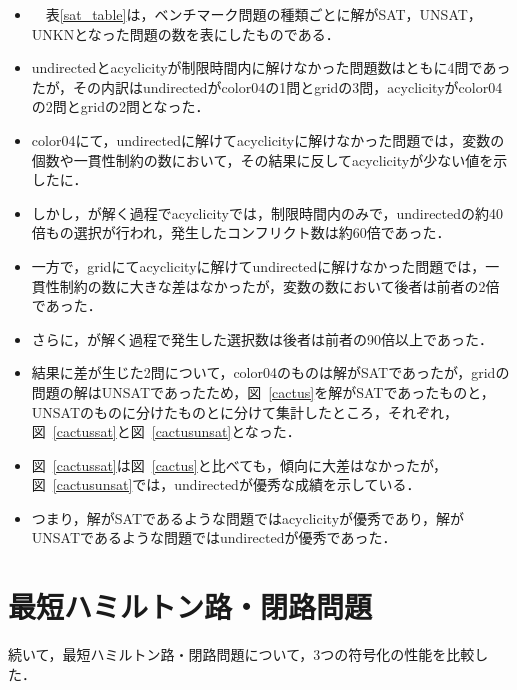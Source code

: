 \begin{itemize}
\item　表\ref{sat_table}は，ベンチマーク問題の種類ごとに解がSAT，UNSAT，UNKNとなった問題の数を表にしたものである．
\item \textsf{undirected}と\textsf{acyclicity}が制限時間内に解けなかった問題数はともに4問であったが，その内訳は\textsf{undirected}がcolor04の1問とgridの3問，\textsf{acyclicity}がcolor04の2問とgridの2問となった．
\item color04にて，\textsf{undirected}に解けて\textsf{acyclicity}に解けなかった問題では，変数の個数や一貫性制約の数において，その結果に反して\textsf{acyclicity}が少ない値を示したに．
\item しかし，{\clingo}が解く過程で\textsf{acyclicity}では，制限時間内のみで，\textsf{undirected}の約40倍もの選択が行われ，発生したコンフリクト数は約60倍であった．
\item 一方で，gridにて\textsf{acyclicity}に解けて\textsf{undirected}に解けなかった問題では，一貫性制約の数に大きな差はなかったが，変数の数において後者は前者の2倍であった．
\item さらに，{\clingo}が解く過程で発生した選択数は後者は前者の90倍以上であった．
\item 結果に差が生じた2問について，color04のものは解がSATであったが，gridの問題の解はUNSATであったため，図~\ref{cactus}を解がSATであったものと，UNSATのものに分けたものとに分けて集計したところ，それぞれ，図~\ref{cactussat}と図~\ref{cactusunsat}となった．
\item 図~\ref{cactussat}は図~\ref{cactus}と比べても，傾向に大差はなかったが，図~\ref{cactusunsat}では，\textsf{undirected}が優秀な成績を示している．
\item つまり，解がSATであるような問題では\textsf{acyclicity}が優秀であり，解がUNSATであるような問題では\textsf{undirected}が優秀であった．
\end{itemize}


\section{最短ハミルトン路・閉路問題}


続いて，最短ハミルトン路・閉路問題について，3つの符号化の性能を比較した．

